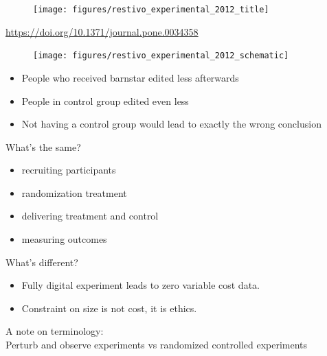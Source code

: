 \documentclass[aspectratio=169]{beamer}
\begin{document}
\begin{frame}

\begin{figure}
  \centering
  \texttt{[image: figures/restivo\_experimental\_2012\_title]}
\end{figure}

\vfill
\url{ https://doi.org/10.1371/journal.pone.0034358}
\end{frame}
\begin{frame}

\begin{figure}
  \centering
  \texttt{[image: figures/restivo\_experimental\_2012\_schematic]}
\end{figure}

\pause
\begin{itemize}
\item People who received barnstar edited less afterwards \pause
\item People in control group edited even less \pause
\item Not having a control group would lead to exactly the wrong conclusion
\end{itemize}

\end{frame}
\begin{frame}

What's the same?
\begin{itemize}
\item recruiting participants
\item randomization treatment
\item delivering treatment and control
\item measuring outcomes
\end{itemize}

\pause 
\vfill

What's different?
\begin{itemize}
\item Fully digital experiment leads to zero variable cost data.
\pause
\item Constraint on size is not cost, it is ethics.
\end{itemize}

\end{frame}
\begin{frame}

A note on terminology:\\
Perturb and observe experiments vs randomized controlled experiments

\end{frame}
\end{document}
